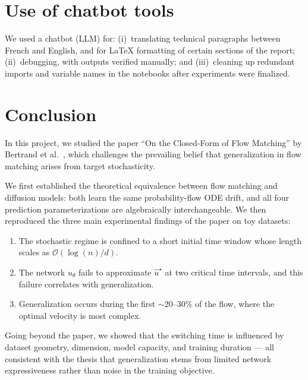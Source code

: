 \documentclass[10pt,a4paper]{article}
\theoremstyle{definition}
\begin{document}
\section{Use of chatbot tools}\label{sec:tools}

We used a chatbot (LLM) for: (i)~translating technical paragraphs between French and English, and for \LaTeX{} formatting of certain sections of the report; (ii)~debugging, with outputs verified manually; and (iii)~cleaning up redundant imports and variable names in the notebooks after experiments were finalized.

\section{Conclusion}\label{sec:conclusion}

In this project, we studied the paper ``On the Closed-Form of Flow Matching'' by Bertrand et al.~\cite{bertrand2025closed}, which challenges the prevailing belief that generalization in flow matching arises from target stochasticity.

We first established the theoretical equivalence between flow matching and diffusion models: both learn the same probability-flow ODE drift, and all four prediction parameterizations are algebraically interchangeable.
We then reproduced the three main experimental findings of the paper on toy datasets:
\begin{enumerate}[nosep,leftmargin=1.5em]
    \item The stochastic regime is confined to a short initial time window whose length scales as $\mathcal{O}(\log(n)/d)$.
    \item The network $u_\theta$ fails to approximate $\hat{u}^\star$ at two critical time intervals, and this failure correlates with generalization.
    \item Generalization occurs during the first $\sim$20--30\% of the flow, where the optimal velocity is most complex.
\end{enumerate}
Going beyond the paper, we showed that the switching time is influenced by dataset geometry, dimension, model capacity, and training duration --- all consistent with the thesis that generalization stems from limited network expressiveness rather than noise in the training objective.
\end{document}
